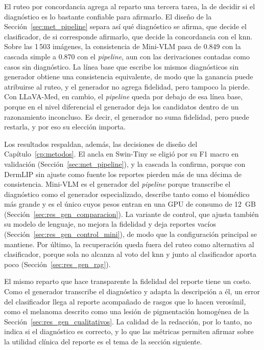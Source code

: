 El ruteo por concordancia agrega al reparto una tercera tarea, la de decidir si el diagnóstico es lo bastante
confiable para afirmarlo. El diseño de la Sección~\ref{sec:met_pipeline} separa así qué diagnóstico se afirma, que
decide el clasificador, de si corresponde afirmarlo, que decide la concordancia con el \gls{knn}. Sobre las 1\,503
imágenes, la consistencia de Mini-VLM pasa de 0.849 con la cascada simple a 0.870 con el \emph{pipeline}, aun con las
derivaciones contadas como casos sin diagnóstico. La línea base que escribe los mismos diagnósticos sin generador
obtiene una consistencia equivalente, de modo que la ganancia puede atribuirse al ruteo, y el generador no agrega
fidelidad, pero tampoco la pierde. Con LLaVA-Med, en cambio, el \emph{pipeline} queda por debajo de esa línea base,
porque en el nivel diferencial el generador deja los candidatos dentro de un razonamiento inconcluso. Es decir, el
generador no suma fidelidad, pero puede restarla, y por eso su elección importa.

Los resultados respaldan, además, las decisiones de diseño del Capítulo~\ref{cp:metodos}. El ancla en Swin-Tiny se
eligió por su F1 macro en validación (Sección~\ref{sec:met_pipeline}), y la cascada la confirma, porque con DermLIP
sin ajuste como fuente los reportes pierden más de una décima de consistencia. Mini-VLM es el generador del
\emph{pipeline} porque transcribe el diagnóstico como el generador especializado, describe tanto como el biomédico más
grande y es el único cuyos pesos entran en una GPU de consumo de 12~GB (Sección~\ref{sec:res_gen_comparacion}). La
variante de control, que ajusta también su modelo de lenguaje, no mejora la fidelidad y deja reportes vacíos
(Sección~\ref{sec:res_gen_control_mini}), de modo que la configuración principal se mantiene. Por último, la
recuperación queda fuera del ruteo como alternativa al clasificador, porque sola no alcanza al voto del \gls{knn} y
junto al clasificador aporta poco (Sección~\ref{sec:res_gen_rag}).

El mismo reparto que hace transparente la fidelidad del reporte tiene un costo. Como el generador transcribe el
diagnóstico y adapta la descripción a él, un error del clasificador llega al reporte acompañado de rasgos que lo hacen
verosímil, como el melanoma descrito como una lesión de pigmentación homogénea de la
Sección~\ref{sec:res_gen_cualitativos}. La calidad de la redacción, por lo tanto, no indica si el diagnóstico es
correcto, y lo que las métricas permiten afirmar sobre la utilidad clínica del reporte es el tema de la sección
siguiente.
